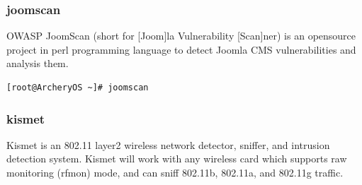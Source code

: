 \documentclass{article}
\begin{document}
\subsubsection{joomscan}
OWASP JoomScan (short for [Joom]la Vulnerability [Scan]ner) is an opensource project in perl programming language to detect Joomla CMS vulnerabilities and analysis them.
\begin{lstlisting}
[root@ArcheryOS ~]# joomscan
\end{lstlisting}

\subsubsection{kismet}
Kismet is an 802.11 layer2 wireless network detector, sniffer, and intrusion detection system.  Kismet will work with any wireless card which supports raw monitoring (rfmon) mode, and can sniff 802.11b, 802.11a, and 802.11g traffic.
\end{document}
